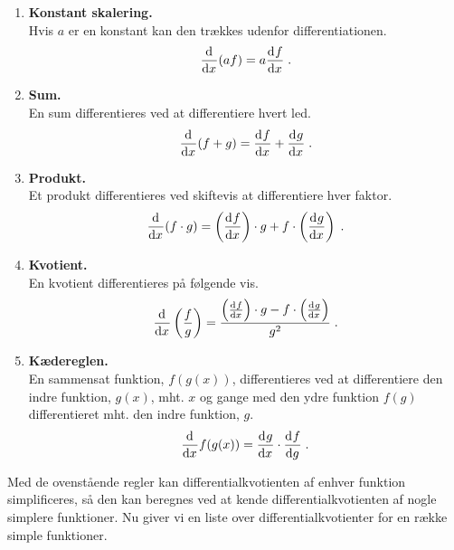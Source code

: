 \begin{enumerate}
	\item\label{itm:d-skalering} \textbf{Konstant skalering.}\\
	Hvis $a$ er en konstant kan den trækkes udenfor differentiationen.
	\[
	\dif{x}{}(a f) = a  \dif{x}{f} \; .
	\]
	\item\label{itm:d-sum} \textbf{Sum.}\\
	En sum differentieres ved at differentiere hvert led.
	\[
	\dif{x}{}(f+g) = \dif{x}{f} + \dif{x}{g} \; .
	\]
	\item\label{itm:d-produkt} \textbf{Produkt.}\\
	Et produkt differentieres ved skiftevis at differentiere hver faktor.
	\[
	\dif{x}{}(f \cdot g) =
	\left(\dif{x}{f}\right) \cdot g + f \cdot \left(\dif{x}{g}\right) \; .
	\]
	\item\label{itm:d-kvotient} \textbf{Kvotient.}\\
	En kvotient differentieres på følgende vis.
	\[
	\dif{x}{} \left( \frac{f}{g} \right)
	= \frac{\left(\dif{x}{f}\right)
		\cdot g - f \cdot \left(\dif{x}{g}\right)}{g^2} \; .
	\]
	\item\label{itm:d-kaederegel} \textbf{Kædereglen.}\\
	En sammensat funktion, $f(g(x))$, differentieres ved at
	differentiere den indre funktion, $g(x)$, mht. $x$ og gange med den
	ydre funktion $f(g)$ differentieret mht. den indre funktion, $g$.
	\[
	\dif{x}{} f(g(x)) = \dif{x}{g} \cdot \dif{g}{f} \; .
	\]
\end{enumerate}
Med de ovenstående regler kan differentialkvotienten af enhver
funktion simplificeres, så den kan beregnes ved at kende
differentialkvotienten af nogle simplere funktioner. Nu giver vi en
liste over differentialkvotienter for en række simple funktioner.

